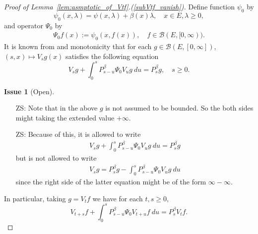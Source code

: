 \documentclass[12pt,a4paper]{amsart}
\numberwithin{equation}{section}
\theoremstyle{plain}
\theoremstyle{definition}
\newtheorem{iss}{Issue}
\begin{document}
\begin{proof}[Proof of Lemma~\ref{lem:asmptotic_of_Vtf}.(\ref{subVtf_vanish})]
Define function $\psi_0$ by
\[
  \psi_0(x,\lambda) = \psi(x,\lambda)+ \beta(x) \lambda,
  \quad x\in E, \lambda \geq 0,
\]
and operator $\Psi_0$ by
\begin{align}
\Psi_0f(x):=\psi_0(x,f(x)), \quad f\in \mathcal B(E,[0,\infty)).
\end{align}
It is known from \cite[Theorem 2.23]{Li2011Measurevalued} and monotonicity that for each $g \in \mathcal B(E,[0,\infty])$, $(s,x)\mapsto V_sg(x)$ satisfies the following equation
\[
  V_sg + \int_0^s P_{s-u}^\beta \Psi_0V_u g~du = P_s^\beta g,
  \quad s\geq 0.
\]
\begin{iss}[Open]~
  \begin{itemize}
  \item[ZS:]
Note that in the above $g$ is not assumed to be bounded. So the both sides might taking the extended value $+\infty$.
\item[ZS:]
Because of this, it is allowed to write
\begin{align}
V_s g + \int_0^s P_{s-u}^\beta \Psi_0 V_u g~du = P_s^\beta g
\end{align}
but is not allowed to write
\begin{align}
  V_s g  = P_s^\beta g - \int_0^s P_{s-u}^\beta \Psi_0 V_u g~du
\end{align}
since the right side of the latter equation might be of the form $\infty - \infty$.
  \end{itemize}
\end{iss}
In particular, taking $g=V_tf$ we have for each $t,s \geq 0$,
\begin{equation}
  \label{eq:equation_for_Vtf}
  V_{t+s}f + \int_0^s P^\beta_{s-u}\Psi_0V_{t+u}f~du
  =P^\beta_s V_t f.
\end{equation}


\end{proof}
\end{document}
